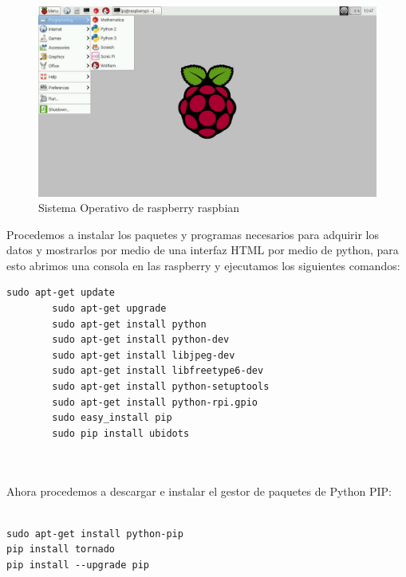 \documentclass[10pt]{article}\usepackage[]{graphicx}\usepackage[]{color}
\begin{document}
	
	\begin{figure}[ht] %
		\centering
		\includegraphics[scale=0.5]{raspbian}   %
		\caption{Sistema Operativo de raspberry raspbian}
		
	\end{figure}
	
	Procedemos a instalar los paquetes y programas necesarios para adquirir los datos y mostrarlos por medio de una interfaz HTML por medio de python, para esto abrimos una consola en las raspberry y ejecutamos los siguientes comandos: 
	
			
\begin{small}
			\begin{lstlisting}[frame=single]
		sudo apt-get update
		sudo apt-get upgrade
		sudo apt-get install python
		sudo apt-get install python-dev
		sudo apt-get install libjpeg-dev
		sudo apt-get install libfreetype6-dev
		sudo apt-get install python-setuptools
		sudo apt-get install python-rpi.gpio
		sudo easy_install pip
		sudo pip install ubidots
		
			
			\end{lstlisting}
\end{small}	

Ahora procedemos a descargar e instalar el gestor de paquetes de Python PIP:

\begin{small}
	\begin{lstlisting}[frame=single]
	
sudo apt-get install python-pip
pip install tornado
pip install --upgrade pip
	
	\end{lstlisting}
\end{small}	
	
\end{document}
